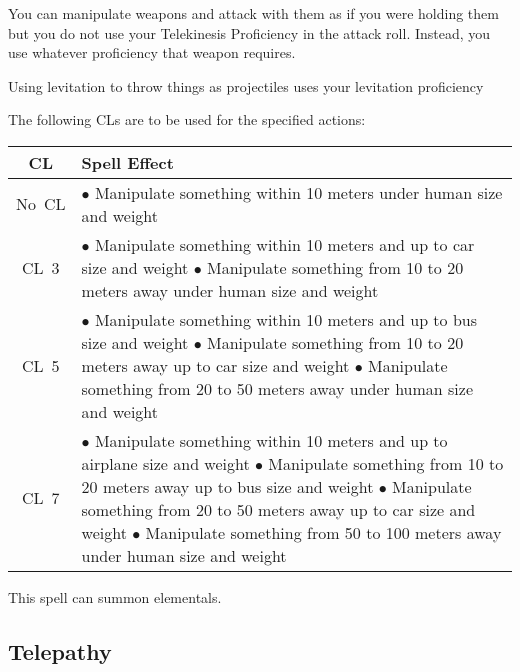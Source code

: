 You can manipulate weapons and attack with them as if you were holding them but you do not use your Telekinesis Proficiency in the attack roll. Instead, you use whatever proficiency that weapon requires.

Using levitation to throw things as projectiles uses your levitation proficiency

The following CLs are to be used for the specified actions:

\begin{center}
    \begin{tabular}{|c m{}|} 
      \hline
      \textbf{CL} & \textbf{Spell Effect} \\ 
      \hline
      No~CL & 
        $\bullet$ Manipulate something within 10 meters under human size and weight \\ \hline
      CL~3 & 
        $\bullet$ Manipulate something within 10 meters and up to car size and weight \newline
        $\bullet$ Manipulate something from 10 to 20 meters away under human size and weight \\ \hline
      CL~5 & 
        $\bullet$ Manipulate something within 10 meters and up to bus size and weight \newline
        $\bullet$ Manipulate something from 10 to 20 meters away up to car size and weight \newline
        $\bullet$ Manipulate something from 20 to 50 meters away under human size and weight \\ \hline
      CL~7 &
        $\bullet$ Manipulate something within 10 meters and up to airplane size and weight \newline
        $\bullet$ Manipulate something from 10 to 20 meters away up to bus size and weight \newline
        $\bullet$ Manipulate something from 20 to 50 meters away up to car size and weight \newline
        $\bullet$ Manipulate something from 50 to 100 meters away under human size and weight \\
      \hline
    \end{tabular}
\end{center}

This spell can summon elementals.

\subsection{Telepathy}

